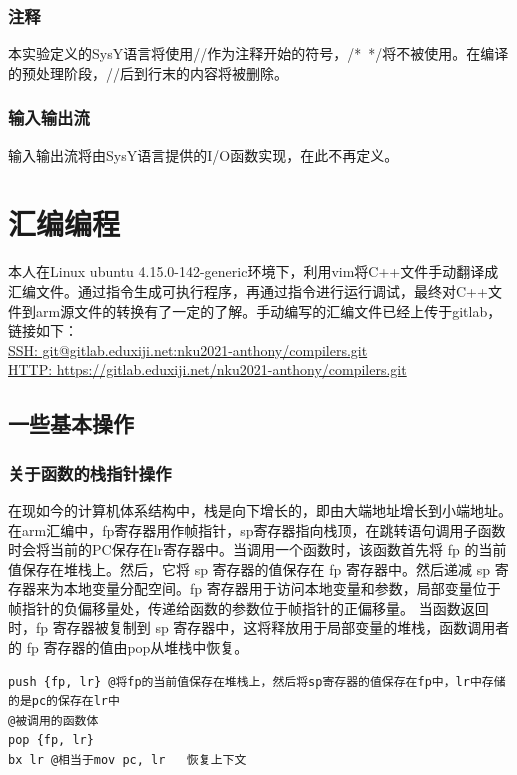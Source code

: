 \documentclass[UTF8,a4paper,10pt]{ctexart}
\begin{document}
\subsubsection{注释}
本实验定义的SysY语言将使用//作为注释开始的符号，/*\ */将不被使用。在编译的预处理阶段，//后到行末的内容将被删除。
\subsubsection{输入输出流}
输入输出流将由SysY语言提供的I/O函数实现，在此不再定义。
\newpage




\section{汇编编程}
本人在Linux ubuntu 4.15.0-142-generic环境下，利用vim将C++文件手动翻译成汇编文件。通过指令生成可执行程序，再通过指令进行运行调试，最终对C++文件到arm源文件的转换有了一定的了解。手动编写的汇编文件已经上传于gitlab，链接如下：\\
\href{git@gitlab.eduxiji.net:nku2021-anthony/compilers.git}{SSH: git@gitlab.eduxiji.net:nku2021-anthony/compilers.git}\\
\href{https://gitlab.eduxiji.net/nku2021-anthony/compilers.git}{HTTP:  https://gitlab.eduxiji.net/nku2021-anthony/compilers.git}
\subsection{一些基本操作}
\subsubsection{关于函数的栈指针操作}
在现如今的计算机体系结构中，栈是向下增长的，即由大端地址增长到小端地址。在arm汇编中，fp寄存器用作帧指针，sp寄存器指向栈顶，在跳转语句调用子函数时会将当前的PC保存在lr寄存器中。当调用一个函数时，该函数首先将 fp 的当前值保存在堆栈上。然后，它将 sp 寄存器的值保存在 fp 寄存器中。然后递减 sp 寄存器来为本地变量分配空间。fp 寄存器用于访问本地变量和参数，局部变量位于帧指针的负偏移量处，传递给函数的参数位于帧指针的正偏移量。
当函数返回时，fp 寄存器被复制到 sp 寄存器中，这将释放用于局部变量的堆栈，函数调用者的 fp 寄存器的值由pop从堆栈中恢复。\cite{zhn}
\begin{lstlisting}[title = 函数被调用时的基本框架]
push {fp, lr} @将fp的当前值保存在堆栈上，然后将sp寄存器的值保存在fp中，lr中存储的是pc的保存在lr中
@被调用的函数体
pop {fp, lr} 
bx lr @相当于mov pc, lr   恢复上下文
\end{lstlisting}
\end{document}
